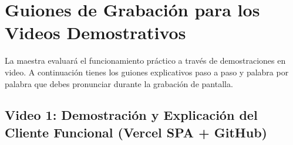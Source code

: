 \documentclass[12pt,a4paper]{article}
\begin{document}
\newpage
{}
\tableofcontents
\newpage

\section{Guiones de Grabación para los Videos Demostrativos}

La maestra evaluará el funcionamiento práctico a través de demostraciones en video. A continuación tienes los guiones explicativos paso a paso y palabra por palabra que debes pronunciar durante la grabación de pantalla.

\subsection{Video 1: Demostración y Explicación del Cliente Funcional (Vercel SPA + GitHub)}
\end{document}
